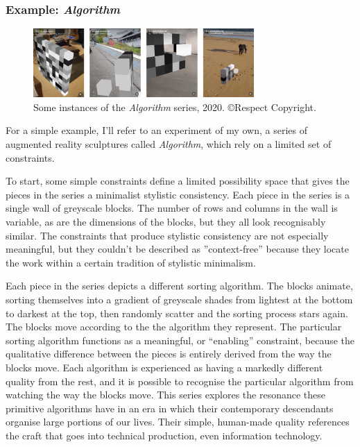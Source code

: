 \documentclass[letterpaper]{article}
\begin{document}
    \subsubsection{Example: \emph{Algorithm}}

    \begin{figure}[h]
    \includegraphics[width=3.31in]{bubble-sort.png}
    \caption{Some instances of the \emph{Algorithm} series, 2020. \copyright Respect Copyright.}
    \end{figure}

    For a simple example, I'll refer to an experiment of my own, a series of augmented reality sculptures called \emph{Algorithm}, which rely on a limited set of constraints.
    
    To start, some simple constraints define a limited possibility space that gives the pieces in the series a minimalist stylistic consistency. Each piece in the series is a single wall of greyscale blocks. The number of rows and columns in the wall is variable, as are the dimensions of the blocks, but they all look recognisably similar. The constraints that produce stylistic consistency are not especially meaningful, but they couldn't be described as ”context-free” because they locate the work within a certain tradition of stylistic minimalism.
    
    Each piece in the series depicts a different sorting algorithm. The blocks animate, sorting themselves into a gradient of greyscale shades from lightest at the bottom to darkest at the top, then randomly scatter and the sorting process stars again. The blocks move according to the the algorithm they represent. The particular sorting algorithm functions as a meaningful, or “enabling” constraint, because the qualitative difference between the pieces is entirely derived from the way the blocks move. Each algorithm is experienced as having a markedly different quality from the rest, and it is possible to recognise the particular algorithm from watching the way the blocks move. This series explores the resonance these primitive algorithms have in an era in which their contemporary descendants organise large portions of our lives. Their simple, human-made quality references the craft that goes into technical production, even information technology.
\end{document}
